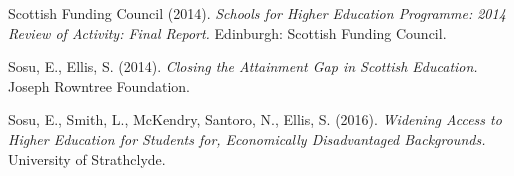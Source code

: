 \documentclass[11pt, english]{article}
\begin{document}
\begin{thebibliography}{9}
		Scottish Funding Council (2014).
		\textsl{Schools for Higher Education Programme: 2014 Review of Activity: Final Report.}
		Edinburgh: Scottish Funding Council.

		Sosu, E., Ellis, S. (2014).
		\textsl{Closing the Attainment Gap in Scottish Education.}
		Joseph Rowntree Foundation.

		Sosu, E., Smith, L., McKendry, Santoro, N., Ellis, S. (2016). 
		\textsl{Widening Access to Higher Education for Students for, Economically Disadvantaged Backgrounds.}
		University of Strathclyde.

	\end{thebibliography}
\end{document}
